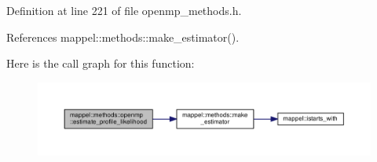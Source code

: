 Definition at line 221 of file openmp\+\_\+methods.\+h.



References mappel\+::methods\+::make\+\_\+estimator().



Here is the call graph for this function\+:\nopagebreak
\begin{figure}[H]
\begin{center}
\leavevmode
\includegraphics[width=350pt]{namespacemappel_1_1methods_1_1openmp_a190af7ff01303344aeeb71628f8c9558_cgraph}
\end{center}
\end{figure}


